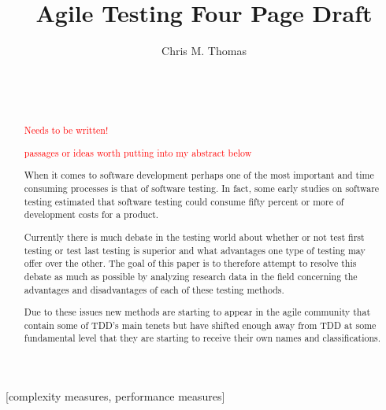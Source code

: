\documentclass{sig-alternate}
\newcommand{\mycomment}[1]{\textcolor{red}{#1}}
\begin{document}

\title{Agile Testing Four Page Draft}


\author{
\alignauthor
Chris M. Thomas\\
	\\
	\\
	\\
}

\maketitle
\begin{abstract}
\mycomment{Needs to be written!}

\mycomment{passages or ideas worth putting into my abstract below}

When it comes to software development perhaps one of the most important and time consuming processes is that of software testing.  In fact, some early studies on software testing estimated that software testing could consume fifty percent or more of development costs for a product.

Currently there is much debate in the testing world about whether or not test first testing or test last testing is superior and what advantages one type of testing may offer over the other.  The goal of this paper is to therefore attempt to resolve this debate as much as possible by analyzing research data in the field concerning the advantages and disadvantages of each of these testing methods. 

Due to these issues new methods are starting to appear in the agile community that contain some of TDD's main tenets but have shifted enough away from TDD at some fundamental level that they are starting to receive their own names and classifications. 
\end{abstract}

[complexity measures, performance measures]
\end{document}

